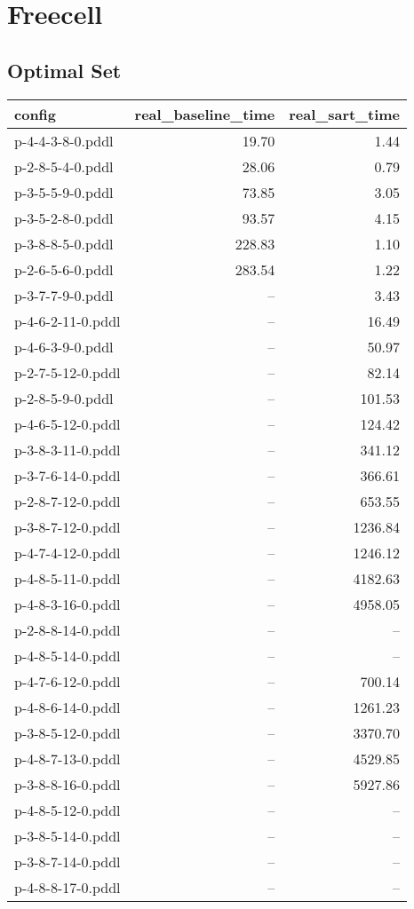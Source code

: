 \documentclass{article}
\begin{document}
                \newpage \section{Freecell}
                    \subsection*{Optimal Set}
                    
                            \begin{center}
                            \scriptsize
                            \begin{tabular}{@{}l|r|r@{}}
                            config & real\_baseline\_time & real\_sart\_time\\\midrule
                             p-4-4-3-8-0.pddl&19.70&1.44\\
 p-2-8-5-4-0.pddl&28.06&0.79\\
 p-3-5-5-9-0.pddl&73.85&3.05\\
 p-3-5-2-8-0.pddl&93.57&4.15\\
 p-3-8-8-5-0.pddl&228.83&1.10\\
 p-2-6-5-6-0.pddl&283.54&1.22\\
 p-3-7-7-9-0.pddl&--&3.43\\
 p-4-6-2-11-0.pddl&--&16.49\\
 p-4-6-3-9-0.pddl&--&50.97\\
 p-2-7-5-12-0.pddl&--&82.14\\
 p-2-8-5-9-0.pddl&--&101.53\\
 p-4-6-5-12-0.pddl&--&124.42\\
 p-3-8-3-11-0.pddl&--&341.12\\
 p-3-7-6-14-0.pddl&--&366.61\\
 p-2-8-7-12-0.pddl&--&653.55\\
 p-3-8-7-12-0.pddl&--&1236.84\\
 p-4-7-4-12-0.pddl&--&1246.12\\
 p-4-8-5-11-0.pddl&--&4182.63\\
 p-4-8-3-16-0.pddl&--&4958.05\\
 p-2-8-8-14-0.pddl&--&--\\
 p-4-8-5-14-0.pddl&--&--\\
 p-4-7-6-12-0.pddl&--&700.14\\
 p-4-8-6-14-0.pddl&--&1261.23\\
 p-3-8-5-12-0.pddl&--&3370.70\\
 p-4-8-7-13-0.pddl&--&4529.85\\
 p-3-8-8-16-0.pddl&--&5927.86\\
 p-4-8-5-12-0.pddl&--&--\\
 p-3-8-5-14-0.pddl&--&--\\
 p-3-8-7-14-0.pddl&--&--\\
 p-4-8-8-17-0.pddl&--&--
                            \end{tabular}
                            \end{center}
                    
\end{document}
